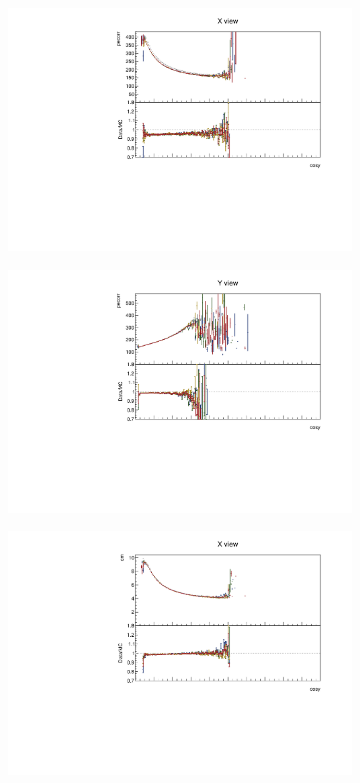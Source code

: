 \documentclass[12pt,a4paper]{article}
\begin{document}
\begin{figure}[h!]
\begin{subfigure}{0.5\textwidth}
  \end{subfigure}
  \begin{subfigure}{0.5\textwidth}
    \includegraphics[width=\linewidth]{PlotsAngularDistribution/pecorr_cosy_x.pdf}
  \end{subfigure}
  \begin{subfigure}{0.5\textwidth}
    \includegraphics[width=\linewidth]{PlotsAngularDistribution/pecorr_cosy_y.pdf}
  \end{subfigure}
  \begin{subfigure}{0.5\textwidth}
    \includegraphics[width=\linewidth]{PlotsAngularDistribution/cm_cosy_x.pdf}

\end{subfigure}
\end{figure}
\end{document}
